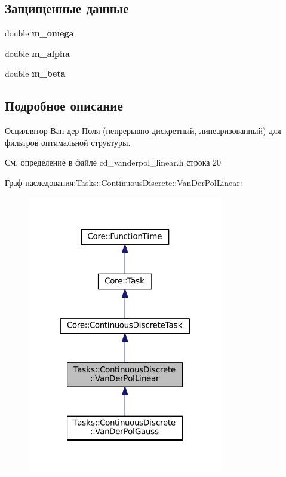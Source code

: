 \subsection*{Защищенные данные}
\begin{DoxyCompactItemize}
\item 
\hypertarget{class_tasks_1_1_continuous_discrete_1_1_van_der_pol_linear_a974f4658bee500533be49e053f15172f}{}\label{class_tasks_1_1_continuous_discrete_1_1_van_der_pol_linear_a974f4658bee500533be49e053f15172f} 
double {\bfseries m\+\_\+omega}
\item 
\hypertarget{class_tasks_1_1_continuous_discrete_1_1_van_der_pol_linear_a6e09423b369c869ea4721e465845912a}{}\label{class_tasks_1_1_continuous_discrete_1_1_van_der_pol_linear_a6e09423b369c869ea4721e465845912a} 
double {\bfseries m\+\_\+alpha}
\item 
\hypertarget{class_tasks_1_1_continuous_discrete_1_1_van_der_pol_linear_a9ca2f773ce65c2b69fea3a4a451afd59}{}\label{class_tasks_1_1_continuous_discrete_1_1_van_der_pol_linear_a9ca2f773ce65c2b69fea3a4a451afd59} 
double {\bfseries m\+\_\+beta}
\end{DoxyCompactItemize}


\subsection{Подробное описание}
Осциллятор Ван-\/дер-\/Поля (непрерывно-\/дискретный, линеаризованный) для фильтров оптимальной структуры. 

См. определение в файле cd\+\_\+vanderpol\+\_\+linear.\+h строка 20



Граф наследования\+:Tasks\+:\+:Continuous\+Discrete\+:\+:Van\+Der\+Pol\+Linear\+:\nopagebreak
\begin{figure}[H]
\begin{center}
\leavevmode
\includegraphics[width=242pt]{class_tasks_1_1_continuous_discrete_1_1_van_der_pol_linear__inherit__graph}
\end{center}
\end{figure}


